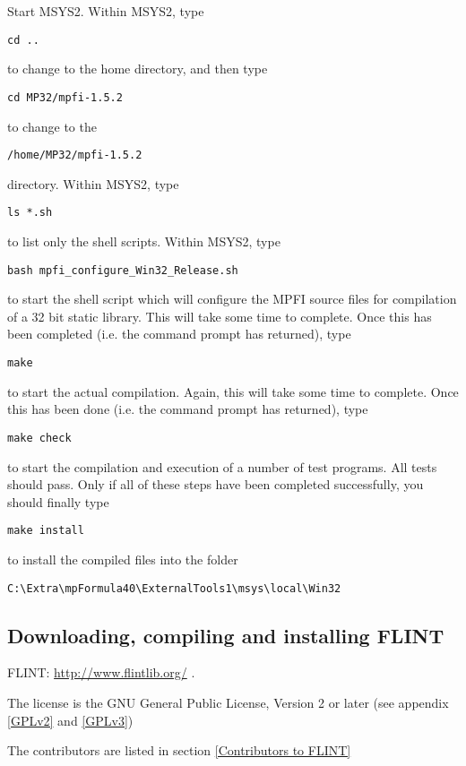 \vpara
Start MSYS2. Within MSYS2, type
\begin{verbatim}
cd ..
\end{verbatim}
to change to the home directory, and then type 
\begin{verbatim}
cd MP32/mpfi-1.5.2
\end{verbatim}
to change to the
\begin{verbatim}
/home/MP32/mpfi-1.5.2
\end{verbatim}
directory. Within MSYS2, type
\begin{verbatim}
ls *.sh
\end{verbatim}
to list only the shell scripts. Within MSYS2, type
\begin{verbatim}
bash mpfi_configure_Win32_Release.sh
\end{verbatim}
to start the shell script which will configure the MPFI source files for compilation of a 32 bit static library. This will take some time to complete. Once this has been completed (i.e. the command prompt has returned), type
\begin{verbatim}
make
\end{verbatim}
to start the actual compilation. Again, this will take some time to complete. Once this has been done (i.e. the command prompt has returned), type
\begin{verbatim}
make check
\end{verbatim}
to start the compilation and execution of a number of test programs. All tests should pass. Only if all of these steps have been completed successfully, you should finally type
\begin{verbatim}
make install
\end{verbatim}
to install the compiled files into the folder
\begin{verbatim}
C:\Extra\mpFormula40\ExternalTools1\msys\local\Win32
\end{verbatim}



\newpage
\subsection{Downloading, compiling and installing FLINT}

FLINT: \href{http://www.flintlib.org/}{http://www.flintlib.org/} . 

\vpara
The license is the GNU General Public License, Version 2 or later (see appendix \ref{GPLv2} and \ref{GPLv3})

\vpara
The contributors are listed in section \ref{Contributors to FLINT}

